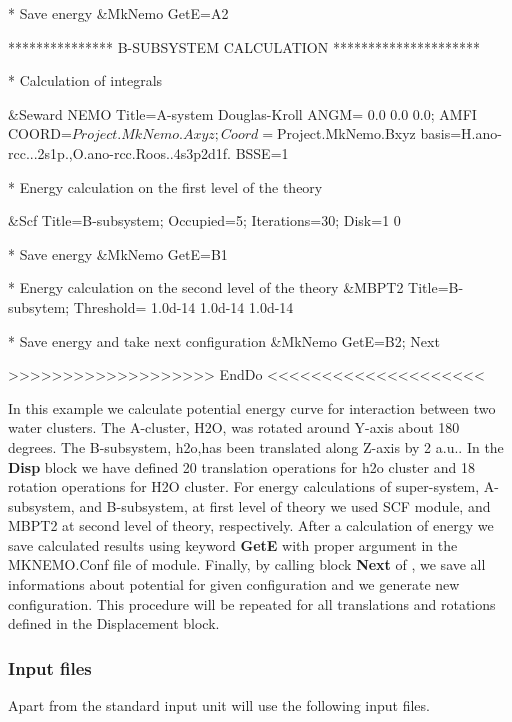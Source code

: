\begin{sourcelisting}
  * Save energy
  &MkNemo
    GetE=A2

  *************** B-SUBSYSTEM CALCULATION *********************

  * Calculation of integrals

  &Seward
    NEMO
    Title=A-system
    Douglas-Kroll
    ANGM= 0.0 0.0 0.0; AMFI
    COORD=$Project.MkNemo.Axyz;Coord=$Project.MkNemo.Bxyz
    basis=H.ano-rcc...2s1p.,O.ano-rcc.Roos..4s3p2d1f.
    BSSE=1


  * Energy calculation on the first level of the theory

   &Scf
     Title=B-subsystem; Occupied=5; Iterations=30; Disk=1 0

   * Save energy
   &MkNemo
     GetE=B1

  * Energy calculation on the second level of the theory
   &MBPT2
     Title=B-subsytem; Threshold= 1.0d-14 1.0d-14 1.0d-14


  * Save energy and take next configuration
   &MkNemo
    GetE=B2; Next

>>>>>>>>>>>>>>>>>>> EndDo <<<<<<<<<<<<<<<<<<<<
\end{sourcelisting}

In this example we calculate potential energy curve for interaction between two water clusters. The A-cluster, H2O, was rotated around Y-axis about 180 degrees. The B-subsystem, h2o,has been translated along Z-axis by 2 a.u.. In the {\bf Disp} block we have defined 20 translation operations for h2o cluster and 18 rotation operations for H2O cluster. For energy calculations of super-system, A-subsystem, and B-subsystem, at first level of theory we used SCF module, and MBPT2 at second level of theory, respectively. After a calculation of energy we save calculated results using keyword {\bf GetE} with proper argument in the MKNEMO.Conf file of  module. Finally, by calling block {\bf Next} of , we save all informations about potential for given configuration and we generate new configuration. This procedure will be repeated for all translations and rotations defined in the Displacement block.

\subsubsection{Input files}
Apart from the standard input unit  will use the following input files.

